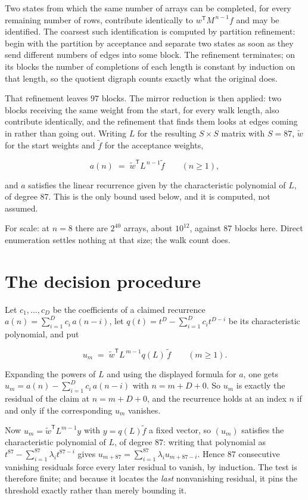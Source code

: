 \documentclass[11pt]{article}
\theoremstyle{definition}
\begin{document}
Two states from which the same number of arrays can be completed, for every remaining number of rows, contribute identically to $w^{\mathsf T}M^{\,n-1}f$ and may be identified. The coarsest such identification is computed by partition refinement: begin with the partition by acceptance and separate two states as soon as they send different numbers of edges into some block. The refinement terminates; on its blocks the number of completions of each length is constant by induction on that length, so the quotient digraph counts exactly what the original does.

That refinement leaves $97$ blocks. The mirror reduction is then applied: two blocks receiving the same weight from the start, for every walk length, also contribute identically, and the refinement that finds them looks at edges coming in rather than going out. Writing $L$ for the resulting $S \times S$ matrix with $S = 87$, $\tilde w$ for the start weights and $\tilde f$ for the acceptance weights,

\[a(n) \;=\; \tilde w^{\mathsf T} L^{\,n-1} \tilde f \qquad (n \ge 1),\]

and $a$ satisfies the linear recurrence given by the characteristic polynomial of $L$, of degree $87$. This is the only bound used below, and it is computed, not assumed.

For scale: at $n = 8$ there are $2^{40}$ arrays, about $10^{12}$, against $87$ blocks here. Direct enumeration settles nothing at that size; the walk count does.

\section{The decision procedure}

Let $c_1,\dots,c_D$ be the coefficients of a claimed recurrence $a(n) = \sum_{i=1}^{D} c_i\,a(n-i)$, let $q(t) = t^{D} - \sum_{i=1}^{D} c_i t^{D-i}$ be its characteristic polynomial, and put

\[u_m \;=\; \tilde w^{\mathsf T} L^{\,m-1} q(L)\,\tilde f \qquad (m \ge 1).\]

Expanding the powers of $L$ and using the displayed formula for $a$, one gets $u_m = a(n) - \sum_{i=1}^{D} c_i\,a(n-i)$ with $n = m + D + 0$. So $u_m$ is exactly the residual of the claim at $n = m + D + 0$, and the recurrence holds at an index $n$ if and only if the corresponding $u_m$ vanishes.

Now $u_m = \tilde w^{\mathsf T} L^{m-1} y$ with $y = q(L)\tilde f$ a fixed vector, so $(u_m)$ satisfies the characteristic polynomial of $L$, of degree $87$: writing that polynomial as $t^{87} - \sum_{i=1}^{87} \lambda_i t^{87-i}$ gives $u_{m+87} = \sum_{i=1}^{87} \lambda_i u_{m+87-i}$. Hence $87$ consecutive vanishing residuals force every later residual to vanish, by induction. The test is therefore finite; and because it locates the {\itshape last} nonvanishing residual, it pins the threshold exactly rather than merely bounding it.
\end{document}
